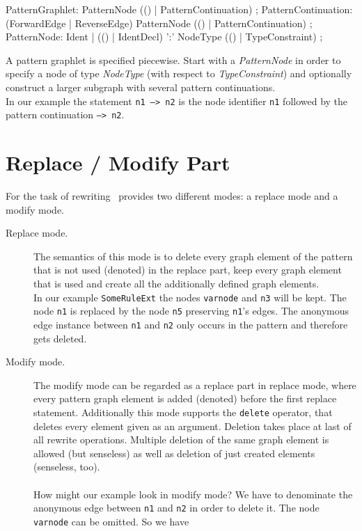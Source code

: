 \begin{rail}   
  PatternGraphlet: PatternNode (() | PatternContinuation) ;
  PatternContinuation: (ForwardEdge | ReverseEdge) PatternNode (() | PatternContinuation) ;
  PatternNode: Ident | 
    (() | IdentDecl) ':' NodeType (() | TypeConstraint) ; 
\end{rail}
A pattern graphlet is specified piecewise. Start with a \emph{PatternNode} in order to specify a node of type \emph{NodeType} (with respect to \emph{TypeConstraint}) and optionally construct a larger subgraph with several pattern continuations. \\
In our example the statement \texttt{n1 --> n2} is the node identifier \texttt{n1} followed by the pattern continuation \texttt{--> n2}.

\section{Replace / Modify Part}
\label{replacepart}
For the task of rewriting \GrG\ provides two different modes: a replace mode and a modify mode.
\begin{description}
  \item[Replace mode.] The semantics of this mode is to delete every graph element of the pattern that is not used (denoted) in the replace part, keep every graph element that is used and create all the additionally defined graph elements.\\
  In our example \texttt{SomeRuleExt} the nodes \texttt{varnode} and \texttt{n3} will be kept. The node \texttt{n1} is replaced by the node \texttt{n5} preserving \texttt{n1}'s edges. The anonymous edge instance between \texttt{n1} and \texttt{n2} only occurs in the pattern and therefore gets deleted.
  \item[Modify mode.] The modify mode can be regarded as a replace part in replace mode, where every pattern graph element is added (denoted) before the first replace statement. Additionally this mode supports the \texttt{delete} operator, that deletes every element given as an argument. Deletion takes place at last of all rewrite operations. Multiple deletion of the same graph element is allowed (but senseless) as well as deletion of just created elements (senseless, too).\\
 {\small \\ How might our example look in modify mode? We have to denominate the anonymous edge between \texttt{n1} and \texttt{n2} in order to delete it. The node \texttt{varnode} can be omitted. So we have}
\begin{grgen}
rule SomeRuleExtMod(varnode: Node): (Node, EdgeTypeB) {
  pattern {
    ...
    n1 -e0:Edge-> n2;
    ...
  }
  modify {
    n5 : NodeTypeC<n1>;
    n3 -e1:EdgeTypeB-> n5;
    delete(e0);
    eval {
      ...
\end{grgen}
\mbox{ }\\
\end{description}

